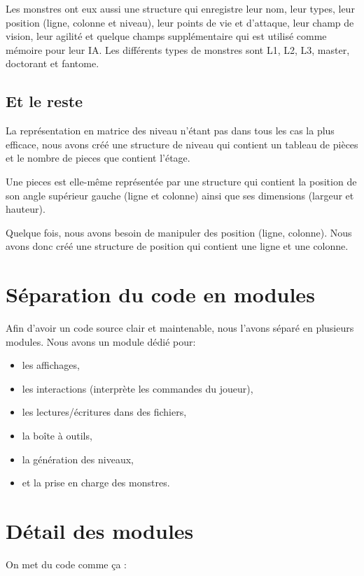 \documentclass[11pt]{report}
\begin{document}
		Les monstres ont eux aussi une structure qui enregistre leur nom, leur types, leur position (ligne, colonne et niveau), leur points de vie et d'attaque, leur champ de vision, leur agilité et quelque champs supplémentaire qui est utilisé comme mémoire pour leur IA. Les différents types de monstres sont L1, L2, L3, master, doctorant et fantome.
		
		\subsection{Et le reste}
		
		La représentation en matrice des niveau n'étant pas dans tous les cas la plus efficace, nous avons créé une structure de niveau qui contient un tableau de pièces et le nombre de pieces que contient l'étage.
		
		Une pieces est elle-même représentée par une structure qui contient la position de son angle supérieur gauche (ligne et colonne) ainsi que ses dimensions (largeur et hauteur).
		
		Quelque fois, nous avons besoin de manipuler des position (ligne, colonne). Nous avons donc créé une structure de position qui contient une ligne et une colonne. 
		
	\section{Séparation du code en modules}
	
	Afin d'avoir un code source clair et maintenable, nous l'avons séparé en plusieurs modules. Nous avons un module dédié pour:
	\begin{itemize}
		\item les affichages,
		\item les interactions (interprète les commandes du joueur),
		\item les lectures/écritures dans des fichiers,
		\item la boîte à outils,
		\item la génération des niveaux,
		\item et la prise en charge des monstres.
	\end{itemize}
	
	
	\section{Détail des modules}

	On met du code comme ça : 
	
\end{document}
